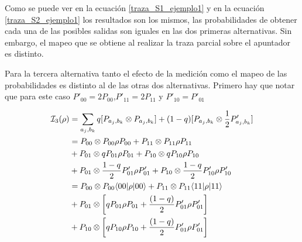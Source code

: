 Como se puede ver en la ecuación {\ref{traza_S1_ejemplo1}} y en la ecuación {\ref{traza_S2_ejemplo1}} los resultados son los mismos, las probabilidades de obtener cada una de las posibles salidas son iguales en las dos primeras alternativas. Sin embargo, el mapeo que se obtiene al realizar la traza parcial sobre el apuntador es distinto. 


Para la tercera alternativa tanto el efecto de la medición como el mapeo de las probabilidades es distinto al de las otras dos alternativas. Primero hay que notar que para este caso $P'_{00}=2P_{00}$,$P'_{11}= 2P_{11}$ y $P'_{10}=P'_{01}$


\begin{equation}\label{tercera_alternativa_ejemplo1}
    \begin{split}
        \mathcal{I}_3(\rho)&=\sum_{a_j,b_k} q [P_{a_j,b_k}\otimes P_{a_j,b_k}]+ (1-q)[P_{a_j,b_k}\otimes \frac{1}{2} P'_{a_j,b_k}]\\
        &=P_{00}\otimes P_{00}\rho P_{00} + P_{11}\otimes P_{11} \rho P_{11}\\
        &+P_{01} \otimes qP_{01}\rho P_{01} +P_{10}\otimes q P_{10}\rho P_{10} \\
        &+P_{01} \otimes \frac{1-q}{2}P'_{01}\rho P'_{01}+P_{10}\otimes \frac{1-q}{2}P'_{10}\rho P'_{10}\\
        &=P_{00}\otimes P_{00} \langle 00|\rho|00\rangle + P_{11}\otimes P_{11} \langle 11|\rho|11\rangle\\
        &+P_{01} \otimes \left[qP_{01}\rho P_{01}+ \frac{(1-q)}{2} P'_{01}\rho P'_{01}\right] \\
        &+P_{10}\otimes \left[qP_{10}\rho P_{10}+ \frac{(1-q)}{2} P'_{01}\rho P'_{01}\right]\\
    \end{split}
\end{equation}

